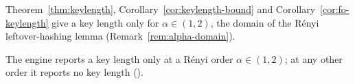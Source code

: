 
Theorem~\ref{thm:keylength}, Corollary~\ref{cor:keylength-bound} and
Corollary~\ref{cor:fo-keylength} give a key length only for
$\alpha\in(1,2)$, the domain of the R\'enyi leftover-hashing lemma
(Remark~\ref{rem:alpha-domain}).

\begin{requirement}\label{req:key-length-alpha-domain}
The engine reports a key length only at a R\'enyi order $\alpha\in(1,2)$;
at any other order it reports no key length
().
\end{requirement}

